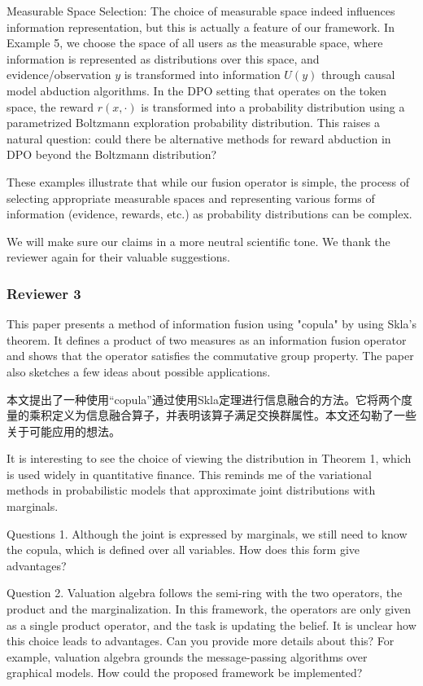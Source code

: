 \documentclass[letterpaper]{article} %
\begin{document}
\begin{CJK*}{UTF8}{gbsn}
Measurable Space Selection:
The choice of measurable space indeed influences information representation, but this is actually a feature of our framework. In Example 5, we choose the space of all users as the measurable space, where information is represented as distributions over this space, and evidence/observation $y$ is transformed into information $U(y)$ through causal model abduction algorithms. In the DPO setting that operates on the token space, the reward $r(x,\cdot)$ is transformed into a probability distribution using a parametrized Boltzmann exploration probability distribution. This raises a natural question: could there be alternative methods for reward abduction in DPO beyond the Boltzmann distribution? 

These examples illustrate that while our fusion operator is simple, the process of selecting appropriate measurable spaces and representing various forms of information (evidence, rewards, etc.) as probability distributions can be complex.

We will make sure our claims in a more neutral scientific tone. We thank the reviewer again for their valuable suggestions.


\subsubsection{Reviewer 3}


This paper presents a method of information fusion using "copula" by using Skla's theorem. It defines a product of two measures as an information fusion operator and shows that the operator satisfies the commutative group property. The paper also sketches a few ideas about possible applications.

本文提出了一种使用“copula”通过使用Skla定理进行信息融合的方法。它将两个度量的乘积定义为信息融合算子，并表明该算子满足交换群属性。本文还勾勒了一些关于可能应用的想法。

It is interesting to see the choice of viewing the distribution in Theorem 1, which is used widely in quantitative finance. This reminds me of the variational methods in probabilistic models that approximate joint distributions with marginals.

Questions 1. Although the joint is expressed by marginals, we still need to know the copula, which is defined over all variables. How does this form give advantages?

Question 2. Valuation algebra follows the semi-ring with the two operators, the product and the marginalization. In this framework, the operators are only given as a single product operator, and the task is updating the belief. It is unclear how this choice leads to advantages. Can you provide more details about this? For example, valuation algebra grounds the message-passing algorithms over graphical models. How could the proposed framework be implemented?


\end{CJK*}
\end{document}
